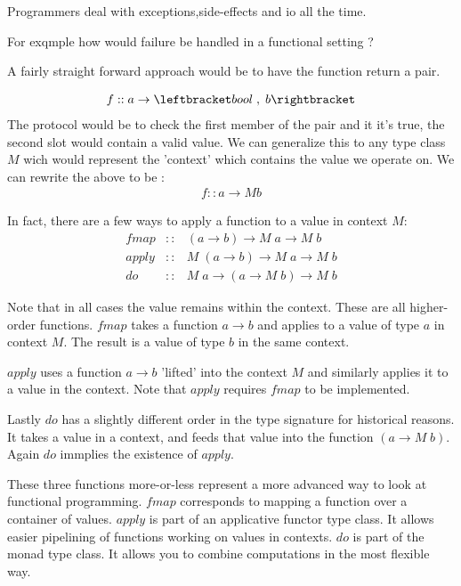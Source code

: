 \documentclass[12pt,fleqn]{article}
\begin{document}
Programmers deal with exceptions,side-effects and io all the time.

For exqmple how would failure be handled in a functional setting ?

A fairly straight forward approach would be to have the function return a pair.

\begin{eqnarray*}
f :: a \rightarrow \leftbracket bool \;,\; b\rightbracket
\end{eqnarray*}
The protocol would be to check the first member of the pair and it it's true, the second slot would contain a valid value.
We can generalize this to any type class $M$ wich would represent the 'context' which contains the value we operate on.
We can rewrite the above to be :
\begin{eqnarray*}
f :: a \rightarrow M b
\end{eqnarray*}

In fact, there are a few  ways to apply a function to a value in  context $M$:
\begin{eqnarray*}
fmap  &::& (a \rightarrow b) \rightarrow M\;a \rightarrow M \;b \\
apply &::& M \; (a \rightarrow b) \rightarrow M\;a \rightarrow M \;b \\
do    &::& M \; a \rightarrow (a \rightarrow M\; b) \rightarrow M \; b
\end{eqnarray*}

Note that in all cases the value remains within the context. 
These are all higher-order functions.
$fmap$ takes a function $a \rightarrow b$ and applies to a value of type $a$ in context $M$. 
The result is a value of type $b$ in the same context.

$apply$ uses a function $a \rightarrow b$ 'lifted' into the context $M$ and similarly applies it to a value in the context.
Note that $apply$ requires $fmap$ to be implemented.

Lastly $do$ has a slightly different order in the type signature for historical reasons. 
It takes a value in a context, and feeds that value into the function $(a \rightarrow M\; b)$.
Again $do$ immplies the existence of $apply$.

These three functions more-or-less represent a more advanced way to look at functional programming.
$fmap$ corresponds to mapping a function over a container of values.
$apply$ is part of an applicative functor type class.
It allows easier pipelining of functions working on values in contexts.
$do$ is part of the monad type class. 
It allows you to combine computations in the most flexible way.
\end{document}
